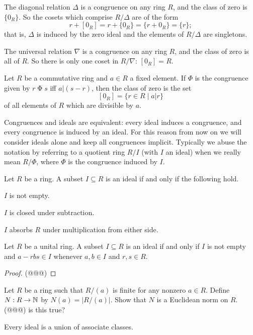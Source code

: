 \begin{examples}
\item The diagonal relation \(\Delta\) is a congruence on any ring \(R\), and the class of zero is \(\{0_R\}\).
So the cosets which comprise \(R/\Delta\) are of the form \[ r+[0_R] = r+\{0_R\} = \{ r+0_R \} = \{r\}; \] that is, \(\Delta\) is induced by the zero ideal and the elements of \(R/\Delta\) are singletons.
\item The universal relation \(\nabla\) is a congruence on any ring \(R\), and the class of zero is all of \(R\).
So there is only one coset in \(R/\nabla\): \([0_R] = R\).
\item Let \(R\) be a commutative ring and \(a \in R\) a fixed element.
If \(\Phi\) is the congruence given by \(r \mathrel{\Phi} s\) iff \(a|(s-r)\), then the class of zero is the set \[ [0_R] = \{ r \in R \mid a|r \} \] of all elements of \(R\) which are divisible by \(a\).
\end{examples}

Congruences and ideals are equivalent: every ideal induces a congruence, and every congruence is induced by an ideal.
For this reason from now on we will consider ideals alone and keep all congruences implicit.
Typically we abuse the notation by referring to a quotient ring \(R/I\) (with \(I\) an ideal) when we really mean \(R/\Phi\), where \(\Phi\) is the congruence induced by \(I\).

\begin{prop}
Let \(R\) be a ring.
A subset \(I \subseteq R\) is an ideal if and only if the following hold.
\begin{proplist*}
\item \(I\) is not empty.
\item \(I\) is closed under subtraction.
\item \(I\) absorbs \(R\) under multiplication from either side.
\end{proplist*}
\end{prop}

\begin{prop}
Let \(R\) be a unital ring.
A subset \(I \subseteq R\) is an ideal if and only if \(I\) is not empty and \(a - rbs \in I\) whenever \(a,b \in I\) and \(r,s \in R\).
\end{prop}

\begin{proof}
(@@@)
\end{proof}



\Exercises%

\begin{exercise}
Let \(R\) be a ring such that \(R/(a)\) is finite for any nonzero \(a \in R\). Define \(N : R \rightarrow \mathbb{N}\) by \(N(a) = |R/(a)|\). Show that \(N\) is a Euclidean norm on \(R\). (@@@) is this true?
\end{exercise}

\begin{exercise}
Every ideal is a union of associate classes.
\end{exercise}
